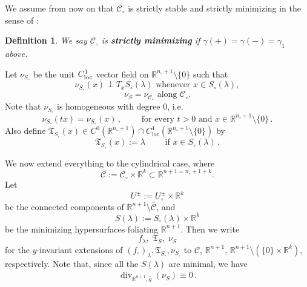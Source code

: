 \documentclass[11pt, letterpaper, reqno]{amsart}
\numberwithin{equation}{section}
\newtheorem{Def}{Definition}[section]
\theoremstyle{remark}
\newcommand{\RR}{\mathbb{R}}
\newcommand{\cC}{\mathcal{C}}
\newcommand{\frT}{\mathfrak{T}}
\newcommand{\Div}{\operatorname{div}}
\begin{document}
   We assume from now on that $\cC_\circ$ is strictly stable and strictly minimizing in the sense of \cite{HardtSimon:isolated}:

   \begin{Def}\label{def:strictly-minimizing}
   We say $\cC_\circ$ is \textbf{strictly minimizing} if $\gamma(+)=\gamma(-) = \gamma_1$ above. 
   \end{Def} 
   

Let $\nu_{{S}_\circ}$ be the unit $C^1_{\textnormal{loc}}$ vector field on $\RR^{n_\circ+1}\setminus \{0\}$ such that
\[ \nu_{{S}_\circ}(x)\perp T_x{S}_\circ(\lambda) \text{ whenever } x\in {S}_\circ(\lambda), \]
\[ \nu_{{S}} = \nu_{\cC_\circ} \text{ along } \cC_\circ. \]
Note that $\nu_{{S}_\circ}$ is homogeneous with degree $0$, i.e. \[
     \nu_{{S}_\circ}(t x) = \nu_{{S}_\circ}(x) \,, \qquad \text{ for every }t>0 \text{ and } x\in \RR^{n_\circ+1}\setminus \{0\}\, . 
   \] 
   Also define $\frT_{{S}_\circ}(x)\in C^0(\RR^{n_\circ+1}) \cap C^1_\textrm{loc}(\RR^{n_\circ+1}\setminus \{0\})$ by \begin{equation}\label{eq:FH definition}
     \frT_{{S}_\circ}(x) := \lambda \qquad \text{ if }x\in {S}_\circ(\lambda) \,.
   \end{equation}
   
   We now extend everything to the cylindrical case, where
   \[ \cC:= \cC_\circ\times \RR^k\subset \RR^{n+1=n_\circ+1+k}. \]
    Let
   \[ U^\pm:= U^\pm_\circ\times \RR^k \]
   be the connected components of $\RR^{n+1}\setminus \overline{\cC}$, and
   \[ {S}(\lambda):= {S}_\circ(\lambda)\times \RR^k \]
   be the minimizing hypersurfaces foliating $\RR^{n+1}$. Then we write
   \[ f_\lambda, \; \frT_{{S}}, \; \nu_{{S}} \]
   for the $y$-invariant extensions of $(f_\circ)_\lambda, \frT_{{S}_\circ}, \nu_{{S}_\circ}$ to $\cC$, $\RR^{n+1}$, $\RR^{n+1} \setminus (\{0\} \times \RR^k)$, respectively. Note that, since all the ${S}(\lambda)$ are minimal, we have 
   \begin{align}
     \Div_{\RR^{n+1},\bar g}(\nu_{{S}}) \equiv 0\,. \label{HS_div(X_H)=0}
   \end{align}
 
\end{document}
